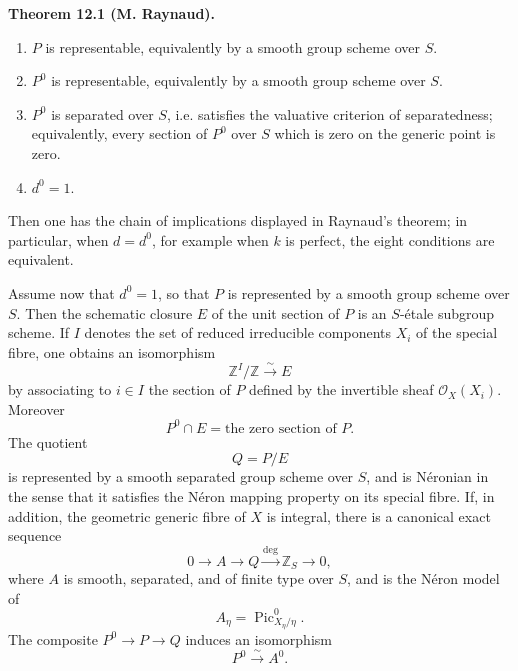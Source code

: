 \documentclass[11pt]{article}
\providecommand{\Pic}{\operatorname{Pic}}
\providecommand{\degop}{\operatorname{deg}}
\providecommand{\cO}{\mathcal O}
\providecommand{\Z}{\mathbb Z}
\newenvironment{statement}[1]{\par\medskip\noindent\textbf{#1.}\ }{\par\medskip}
\begin{document}
\begin{statement}{Theorem 12.1 (M. Raynaud)}
\begin{enumerate}[label=\arabic*)]
\[\]
is an isomorphism, with \(d=1\).
\item \(P\) is representable, equivalently by a smooth group scheme over \(S\).
\item \(P^0\) is representable, equivalently by a smooth group scheme over \(S\).
\item \(P^0\) is separated over \(S\), i.e. satisfies the valuative criterion of separatedness; equivalently, every section of \(P^0\) over \(S\) which is zero on the generic point is zero.
\item \(d^0=1\).
\end{enumerate}
Then one has the chain of implications displayed in Raynaud's theorem; in particular, when \(d=d^0\), for example when \(k\) is perfect, the eight conditions are equivalent.

Assume now that \(d^0=1\), so that \(P\) is represented by a smooth group scheme over \(S\).  Then the schematic closure \(E\) of the unit section of \(P\) is an \(S\)-\'etale subgroup scheme.  If \(I\) denotes the set of reduced irreducible components \(X_i\) of the special fibre, one obtains an isomorphism
\begin{equation}\tag{12.1.5}
        \Z^I/\Z\xrightarrow{\sim}E
\end{equation}
by associating to \(i\in I\) the section of \(P\) defined by the invertible sheaf \(\cO_X(X_i)\).  Moreover
\begin{equation}\tag{12.1.6}
        P^0\cap E=\text{the zero section of }P.
\end{equation}
The quotient
\begin{equation}\tag{12.1.7}
        Q=P/E
\end{equation}
is represented by a smooth separated group scheme over \(S\), and is N\'eronian in the sense that it satisfies the N\'eron mapping property on its special fibre.  If, in addition, the geometric generic fibre of \(X\) is integral, there is a canonical exact sequence
\begin{equation}\tag{12.1.8}
        0\longrightarrow A\longrightarrow Q\xrightarrow{\degop}\Z_S\longrightarrow 0,
\end{equation}
where \(A\) is smooth, separated, and of finite type over \(S\), and is the N\'eron model of
\begin{equation}\tag{12.1.9}
        A_\eta=\Pic^0_{X_\eta/\eta}.
\end{equation}
The composite \(P^0\to P\to Q\) induces an isomorphism
\begin{equation}\tag{12.1.10}
        P^0\xrightarrow{\sim}A^0.
\end{equation}
\end{statement}
\end{document}
